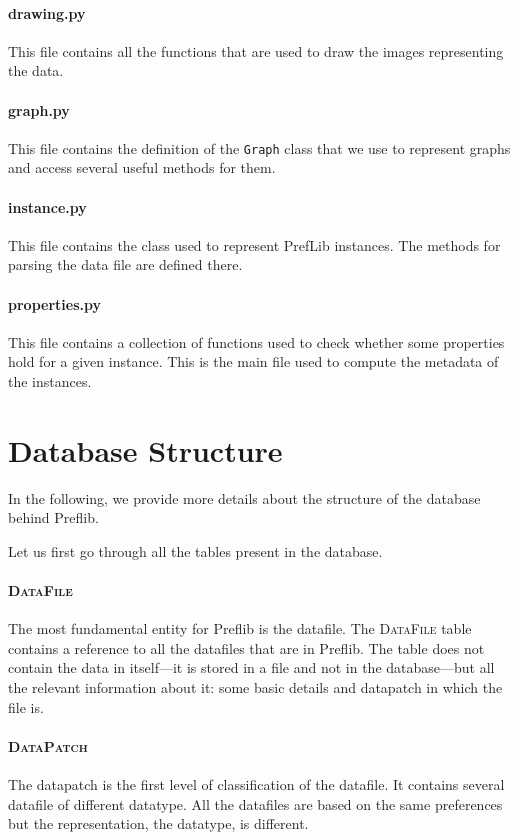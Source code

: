 \documentclass{report}
\begin{document}
	\paragraph*{\faFileO{} drawing.py} This file contains all the functions that are used to draw the images representing the data. 
	
	\paragraph*{\faFileO{} graph.py} This file contains the definition of the \texttt{Graph} class that we use to represent graphs and access several useful methods for them.
	
	\paragraph*{\faFileO{} instance.py} This file contains the class used to represent PrefLib instances. The methods for parsing the data file are defined there.
	
	\paragraph*{\faFileO{} properties.py} This file contains a collection of functions used to check whether some properties hold for a given instance. This is the main file used to compute the metadata of the instances.
	
	
	\section{Database Structure}
	
	In the following, we provide more details about the structure of the database behind Preflib.
	
	\medskip
	
	Let us first go through all the tables present in the database.
	
	\paragraph{\textsc{DataFile}} The most fundamental entity for Preflib is the datafile. The \textsc{DataFile} table contains a reference to all the datafiles that are in Preflib. The table does not contain the data in itself---it is stored in a file and not in the database---but all the relevant information about it: some basic details and datapatch in which the file is.
	
	\paragraph{\textsc{DataPatch}} The datapatch is the first level of classification of the datafile. It contains several datafile of different datatype. All the datafiles are based on the same preferences but the representation, the datatype, is different.
	
\end{document}
